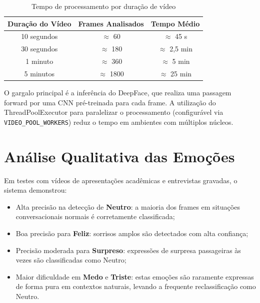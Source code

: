 \documentclass[
	12pt,
	openright,
	oneside,
	a4paper,
	english,
	brazil
	]{abntex2}
\begin{document}
\begin{table}[H]
\centering
\caption{Tempo de processamento por duração de vídeo}
\label{tab:desempenho}
\begin{tabular}{|c|c|c|}
\hline
\textbf{Duração do Vídeo} & \textbf{Frames Analisados} & \textbf{Tempo Médio} \\ \hline
10 segundos               & $\approx$ 60               & $\approx$ 45 s       \\ \hline
30 segundos               & $\approx$ 180              & $\approx$ 2,5 min    \\ \hline
1 minuto                  & $\approx$ 360              & $\approx$ 5 min      \\ \hline
5 minutos                 & $\approx$ 1800             & $\approx$ 25 min     \\ \hline
\end{tabular}
\end{table}

O gargalo principal é a inferência do DeepFace, que realiza uma passagem forward por uma CNN pré-treinada para cada frame. A utilização do ThreadPoolExecutor para paralelizar o processamento (configurável via \texttt{VIDEO\_POOL\_WORKERS}) reduz o tempo em ambientes com múltiplos núcleos.

\section{Análise Qualitativa das Emoções}

Em testes com vídeos de apresentações acadêmicas e entrevistas gravadas, o sistema demonstrou:

\begin{itemize}
    \item Alta precisão na detecção de \textbf{Neutro}: a maioria dos frames em situações conversacionais normais é corretamente classificada;
    \item Boa precisão para \textbf{Feliz}: sorrisos amplos são detectados com alta confiança;
    \item Precisão moderada para \textbf{Surpreso}: expressões de surpresa passageiras às vezes são classificadas como Neutro;
    \item Maior dificuldade em \textbf{Medo} e \textbf{Triste}: estas emoções são raramente expressas de forma pura em contextos naturais, levando a frequente reclassificação como Neutro.
\end{itemize}
\end{document}
